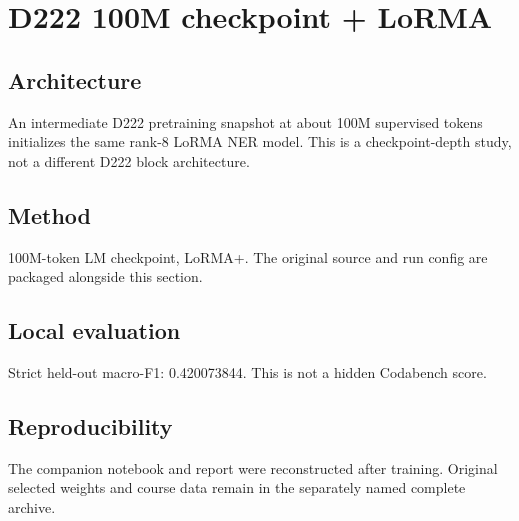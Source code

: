 \section{D222 100M checkpoint + LoRMA}
\subsection{Architecture}
An intermediate D222 pretraining snapshot at about 100M supervised tokens initializes the same rank-8 LoRMA NER model. This is a checkpoint-depth study, not a different D222 block architecture.
\subsection{Method}
100M-token LM checkpoint, LoRMA+. The original source and run config are packaged alongside this section.
\subsection{Local evaluation}
Strict held-out macro-F1: 0.420073844. This is not a hidden Codabench score.
\subsection{Reproducibility}
The companion notebook and report were reconstructed after training. Original selected weights and course data remain in the separately named complete archive.
